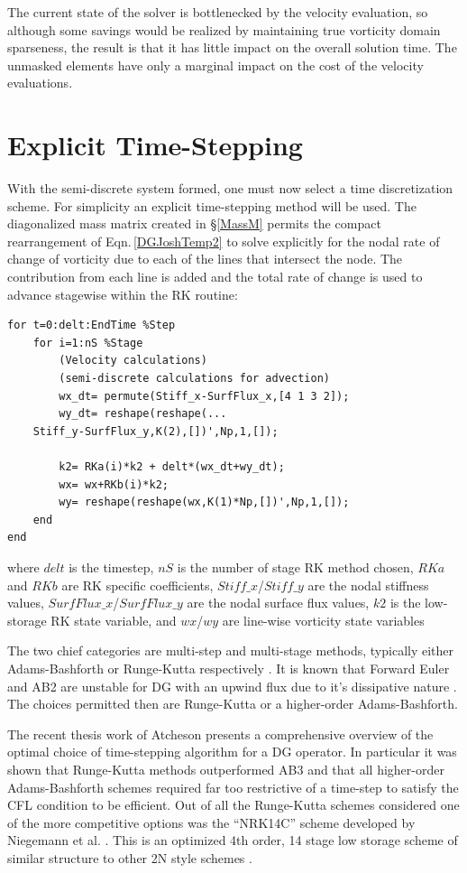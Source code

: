 \documentclass[letterpaper,12pt]{report}
\begin{document}
The current state of the solver is bottlenecked by the velocity evaluation, so although some savings would be realized by maintaining true vorticity domain sparseness, the result is that it has little impact on the overall solution time. The unmasked elements have only a marginal impact on the cost of the velocity evaluations.

%
\section{Explicit Time-Stepping}\label{TimeStep}
With the semi-discrete system formed, one must now select a time discretization scheme. For simplicity an explicit time-stepping method will be used. The diagonalized mass matrix created in \S\ref{MassM} permits the compact rearrangement of Eqn.\,\eqref{DGJoshTemp2} to solve explicitly for the nodal rate of change of vorticity due to each of the lines that intersect the node. The contribution from each line is added and the total rate of change is used to advance stagewise within the RK routine:

\singlespacing
\begin{lstlisting}
for t=0:delt:EndTime %Step
    for i=1:nS %Stage
        (Velocity calculations)
        (semi-discrete calculations for advection)
        wx_dt= permute(Stiff_x-SurfFlux_x,[4 1 3 2]);
        wy_dt= reshape(reshape(...
	Stiff_y-SurfFlux_y,K(2),[])',Np,1,[]);
        
        k2= RKa(i)*k2 + delt*(wx_dt+wy_dt);
        wx= wx+RKb(i)*k2;
        wy= reshape(reshape(wx,K(1)*Np,[])',Np,1,[]);
    end
end
\end{lstlisting}
\doublespacing

where $delt$ is the timestep, $nS$ is the number of stage RK method chosen, $RKa$ and $RKb$ are RK specific coefficients, $Stiff\_x$/$Stiff\_y$ are the nodal stiffness values, $SurfFlux\_x$/$SurfFlux\_y$ are the nodal surface flux values, $k2$ is the low-storage RK state variable, and $wx$/$wy$ are line-wise vorticity state variables

The two chief categories are multi-step and multi-stage methods, typically either Adams-Bashforth or Runge-Kutta respectively \cite{ButcherSurvey}. It is known that Forward Euler and AB2 are unstable for DG with an upwind flux due to it's dissipative nature \cite{Reid}. The choices permitted then are Runge-Kutta or a higher-order Adams-Bashforth.

The recent thesis work of Atcheson \cite{Reid} presents a comprehensive overview of the optimal choice of time-stepping algorithm for a DG operator. In particular it was shown that Runge-Kutta methods outperformed AB3 and that all higher-order Adams-Bashforth schemes required far too restrictive of a time-step to satisfy the CFL condition to be efficient. Out of all the Runge-Kutta schemes considered \cite{Toulorge} one of the more competitive options was the ``NRK14C'' scheme developed by Niegemann et al. \cite{Niegemann}. This is an optimized 4th order, 14 stage low storage scheme of similar structure to other 2N style schemes \cite{Carpenter}.
\end{document}
